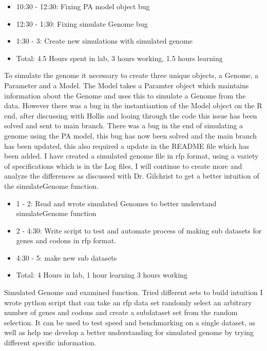 \documentclass[12pt,hyperref]{labbook}
\begin{document}
\begin{itemize}
    \item 10:30 - 12:30: Fixing PA model object bug
    \item 12:30 - 1:30: Fixing simulate Genome bug
    \item 1:30 - 3: Create new simulations with simulated genome
    \item Total: 4.5 Hours spent in lab, 3 hours working, 1.5 hours learning
\end{itemize}
To simulate the genome it necessary to create three unique objects, a Genome, a Parameter and a Model. The Model takes a Paramter object which maintains information about the Genome and uses this to simulate a Genome from the data. However there was a bug in the instantiantion of the Model object on the R end, after discussing with Hollis and looing through the code this issue has been solved and sent to main branch.
There was a bug in the end of simulating a genome using the PA model, this bug has now been solved and the main branch has been updated, this also required a update in the README file which has been added.
I have created a simulated genome file in rfp format, using a variety of specifications which is in the Log files, I will continue to create more and analyze the differences as discussed with Dr. Gilchrist to get a better intuition of the simulateGenome function.
\begin{itemize}
    \item 1 - 2: Read and wrote simulated Genomes to better understand simulateGenome function
    \item 2 - 4:30: Write script to test and automate process of making sub datasets for genes and codons in rfp format.
    \item 4:30 - 5: make new sub datasets
    \item Total: 4 Hours in lab, 1 hour learning 3 hours working
\end{itemize}
Simulated Genome and examined function. Tried different sets to build intuition
I wrote python script that can take an rfp data set randomly select an arbitrary number of genes and codons and create a subdataset set from the random selection.
It can be used to test speed and benchmarking on a single dataset, as well as help me develop a better understanding for simulated genome by trying different specific information.
\end{document}
